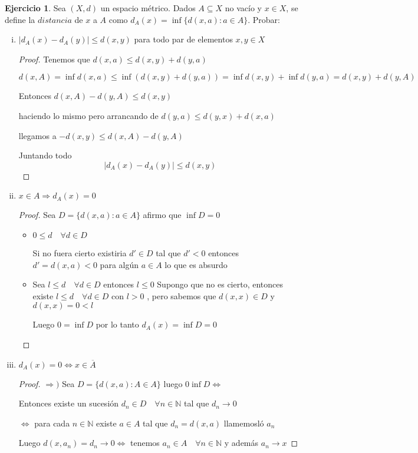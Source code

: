 \documentclass[12pt]{article}
\newcommand{\N}{\mathbb{N}}
\newcommand{\Ra}{\Rightarrow}
\newcommand{\ra}{\rightarrow}
\newcommand{\ol}{\overline}
\theoremstyle{definition}
\newtheorem{ej}{Ejercicio}
\begin{document}
\begin{ej}
  Sea $(X,d)$ un espacio métrico. Dados $A \subseteq X$ no vacío y $x \in X$, se define la $distancia$ de $x$ a $A$ como $d_A(x) = \inf{\{d(x,a):a\in A \}}$. Probar:
  \begin{enumerate}[i.]
    \item $|d_A(x) - d_A(y)| \leq d(x,y)$ para todo par de elementos $x,y \in X$
      \begin{proof}
	Tenemos que $d(x,a) \leq d(x,y) + d(y,a)$ 

	$d(x,A)  = \inf d(x,a) \leq \inf (d(x,y) + d(y,a)) = \inf d(x,y) + \inf d(y,a) = d(x,y) + d(y,A)$

	Entonces $d(x,A) - d(y,A) \leq d(x,y)$

	haciendo lo mismo pero arrancando de $d(y,a) \leq d(y,x) + d(x,a)$

	llegamos a $- d(x,y) \leq d(x,A) - d(y,A)$

	Juntando todo
	$$ |d_A(x) - d_A(y) | \leq d(x,y) $$
      \end{proof} 
    \item $x \in A \Ra d_A(x)=0$
      \begin{proof}
	Sea $D = \{d(x,a) : a \in A\}$ afirmo que $\inf D = 0$
	\begin{itemize}
	  \item $0 \leq d \quad \forall d \in D$ 

	    Si no fuera cierto existiria $d' \in D$ tal que $d' < 0$ entonces $d' = d(x,a) < 0$ para algún $a \in A$ lo que es absurdo
	  \item Sea $l \leq d \quad \forall d \in D $ entonces $l \leq 0$ Supongo que no es cierto, entonces existe $l \leq d \quad \forall d \in D$ con $l > 0$ , pero sabemos que $d(x,x) \in D$ y $d(x,x) = 0 < l$

	    Luego $0 = \inf D$ por lo tanto $d_{A}(x) = \inf D = 0$ 
	  \end{itemize}
	  \end{proof}
	  \newpage
	\item $d_A(x) = 0 \iff x \in \ol A$
	  \begin{proof}
	  $\Ra )$ Sea $D = \{d(x,a):A\in A\}$ luego $0 \inf D \iff$ 

	    Entonces existe un sucesión $d_n \in D \quad \forall n \in \N$ tal que $d_n \ra 0$

	    $\iff$ para cada $n \in \N$  existe $a \in A$ tal que $d_n = d(x,a)$ llamemosló $a_n$ 

	    Luego $d(x,a_n)= d_n \ra 0 \iff$ tenemos $a_n \in A \quad \forall n \in \N$ y además $a_n \ra x$


\end{proof}
\end{enumerate}
\end{ej}
\end{document}
